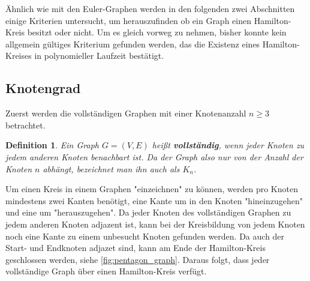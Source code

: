 \documentclass{article}
\newtheorem{mydef}{Definition}
\begin{document}
Ähnlich wie mit den Euler-Graphen werden in den folgenden zwei Abschnitten einige Kriterien untersucht, um herauszufinden ob ein Graph einen Hamilton-Kreis besitzt oder nicht. Um es gleich vorweg zu nehmen, bisher konnte kein allgemein gültiges Kriterium gefunden werden, das die Existenz eines Hamilton-Kreises in polynomieller Laufzeit bestätigt.

%
%
\subsection{Knotengrad}

Zuerst werden die vollständigen Graphen mit einer Knotenanzahl $n \geq 3$ betrachtet.\footnotemark


\begin{mydef}
	Ein Graph $G=(V,E)$ heißt \textbf{vollständig}, wenn jeder Knoten zu jedem anderen Knoten benachbart ist. Da der Graph also nur von der Anzahl der Knoten $n$ abhängt, bezeichnet man ihn auch als $K_n$. \cite{busing2010graphen}
\end{mydef}

Um einen Kreis in einem Graphen "einzeichnen" zu können, werden pro Knoten mindestens zwei Kanten benötigt, eine Kante um in den Knoten "hineinzugehen" und eine um "herauszugehen". Da jeder Knoten des vollständigen Graphen zu jedem anderen Knoten adjazent ist, kann bei der Kreisbildung von jedem Knoten noch eine Kante zu einem unbesucht Knoten gefunden werden. Da auch der Start- und Endknoten adjazet sind, kann am Ende der Hamilton-Kreis geschlossen werden, siehe \autoref{fig:pentagon_graph}.
Daraus folgt, dass jeder vollständige Graph über einen Hamilton-Kreis verfügt.
\end{document}
